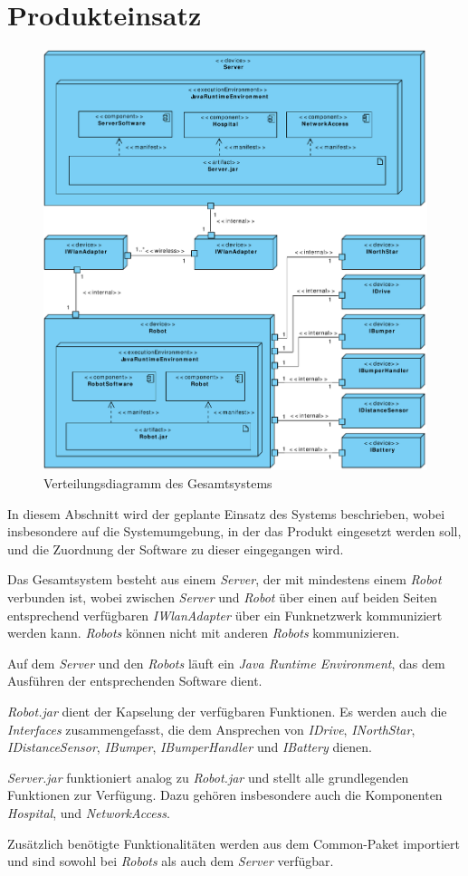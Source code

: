 \section{Produkteinsatz}

\begin{figure}[H]
\centering
\includegraphics[width=1\textwidth]{img/1-Entwurf-9-Produkteinsatz}
\caption{Verteilungsdiagramm des Gesamtsystems}
\label{ProdukteinsatzKomp}
\end{figure}

In diesem Abschnitt wird der geplante Einsatz des Systems beschrieben, wobei insbesondere auf die Systemumgebung, in der das Produkt eingesetzt werden soll, und die Zuordnung der Software zu dieser eingegangen wird.

Das Gesamtsystem besteht aus einem \emph{Server}, der mit mindestens einem \emph{Robot} verbunden ist, wobei zwischen \emph{Server} und \emph{Robot} über einen auf beiden Seiten entsprechend verfügbaren \emph{IWlanAdapter} über ein Funknetzwerk kommuniziert werden kann. \emph{Robots} können nicht mit anderen \emph{Robots} kommunizieren.

Auf dem \emph{Server} und den \emph{Robots} läuft ein \emph{Java Runtime Environment}, das dem Ausführen der entsprechenden Software dient.

\emph{Robot.jar} dient der Kapselung der verfügbaren Funktionen. Es werden auch die \emph{Interfaces} zusammengefasst, die dem Ansprechen von \emph{IDrive}, \emph{INorthStar}, \emph{IDistanceSensor}, \emph{IBumper}, \emph{IBumperHandler} und \emph{IBattery} dienen.

\emph{Server.jar} funktioniert analog zu \emph{Robot.jar} und stellt alle grundlegenden Funktionen zur Verfügung. Dazu gehören insbesondere auch die Komponenten \emph{Hospital}, und \emph{NetworkAccess}.

Zusätzlich benötigte Funktionalitäten werden aus dem Common-Paket importiert und sind sowohl bei \emph{Robots} als auch dem \emph{Server} verfügbar.

